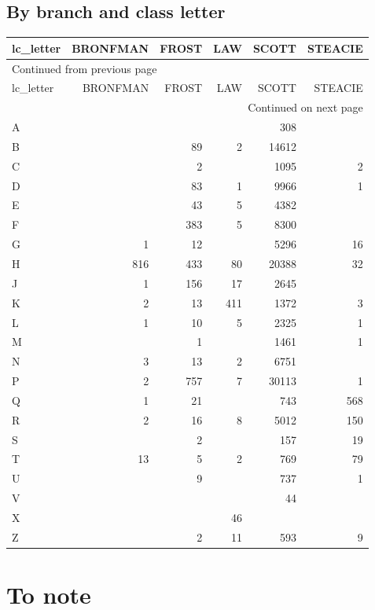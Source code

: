 \documentclass[11pt]{article}
\begin{document}
\subsection*{By branch and class letter}
\label{sec:orgaf3c064}

\begin{longtable}{lrrrrr}
lc\_letter & BRONFMAN & FROST & LAW & SCOTT & STEACIE\\
\hline
\endfirsthead
\multicolumn{6}{l}{Continued from previous page} \\
\hline

lc\_letter & BRONFMAN & FROST & LAW & SCOTT & STEACIE \\

\hline
\endhead
\hline\multicolumn{6}{r}{Continued on next page} \\
\endfoot
\endlastfoot
\hline
A &  &  &  & 308 & \\
B &  & 89 & 2 & 14612 & \\
C &  & 2 &  & 1095 & 2\\
D &  & 83 & 1 & 9966 & 1\\
E &  & 43 & 5 & 4382 & \\
F &  & 383 & 5 & 8300 & \\
G & 1 & 12 &  & 5296 & 16\\
H & 816 & 433 & 80 & 20388 & 32\\
J & 1 & 156 & 17 & 2645 & \\
K & 2 & 13 & 411 & 1372 & 3\\
L & 1 & 10 & 5 & 2325 & 1\\
M &  & 1 &  & 1461 & 1\\
N & 3 & 13 & 2 & 6751 & \\
P & 2 & 757 & 7 & 30113 & 1\\
Q & 1 & 21 &  & 743 & 568\\
R & 2 & 16 & 8 & 5012 & 150\\
S &  & 2 &  & 157 & 19\\
T & 13 & 5 & 2 & 769 & 79\\
U &  & 9 &  & 737 & 1\\
V &  &  &  & 44 & \\
X &  &  & 46 &  & \\
Z &  & 2 & 11 & 593 & 9\\
\end{longtable}

\section*{To note}
\label{sec:org23f6e72}
\end{document}
